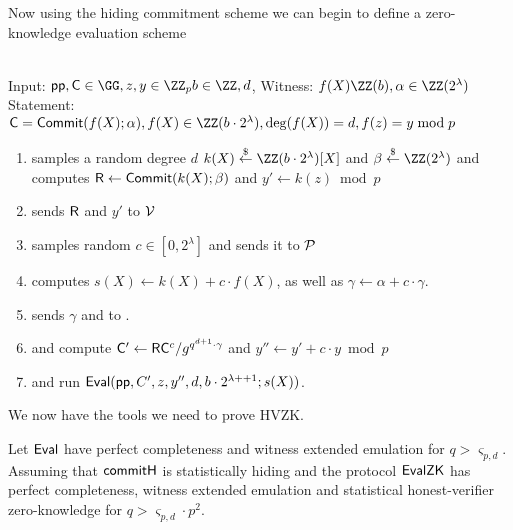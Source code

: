 Now using the hiding commitment scheme we can begin to define a zero-knowledge evaluation scheme
 \noindent\begin{mdframed}[userdefinedwidth=\textwidth]
\begin{minipage}{\textwidth}
	\begin{flushleft}
	\\
	Input: $\crs,\gr{C} \in \GG,z,y \in \ZZ_p b\in \ZZ,d$, Witness: $f(X) \ZZ(b),\alpha \in \ZZ(2^\lambda)$\\
	Statement: $\gr{C}=\commit(f(X);\alpha),f(X) \in \ZZ(b\cdot 2^\lambda),\deg(f(X))=d, f(z)=y \bmod p$
	\begin{enumerate}[nolistsep]
		    \item \prover samples a random degree $d$ $k(X) \sample \ZZ(b\cdot 2^\lambda)[X]$ and $\beta \sample \ZZ(2^\lambda)$ and computes $\mathsf{R}\gets \textsf{{Commit}}(k(X);\beta)$ and $y'\gets k(z) \bmod p$
		    \item \prover sends $\mathsf{R}$ and $y'$ to $\mathcal{V}$
		    \item \verifier samples random $c\in [0,2^\lambda]$ and sends it to $\mathcal{P}$
		    \item \prover computes $s(X)\gets k(X) + c \cdot f(X)$, as well as $\gamma\gets \alpha+ c\cdot \gamma$. 
		    \item \prover sends $\gamma$ and to \verifier.
		    \item \prover and \verifier compute $\mathsf{C}'\gets \mathsf{R}\mathsf{C}^c/g^{q^{d+1}\cdot \gamma}$ and $y''\gets y'+c \cdot y \bmod p$
		    \item \prover and \verifier run $\textsf{{Eval}}(\textsf{pp},C',z,y'',d,b\cdot 2^{\lambda++1};s(X))$.
		   		\end{enumerate}
	\end{flushleft}
\end{minipage}
\end{mdframed}


We now have the tools we need to prove HVZK.

\begin{theorem}
Let $\textsf{{Eval}}$ have perfect completeness and witness extended emulation for $q> \boldsymbol{\varsigma}_{p, d}$. Assuming that $\textsf{{commitH}}$ is statistically hiding and the protocol $\textsf{{EvalZK}}$ has perfect completeness, witness extended emulation and statistical honest-verifier zero-knowledge for $q>\boldsymbol{\varsigma}_{p, d} \cdot p^2$.
\end{theorem}

